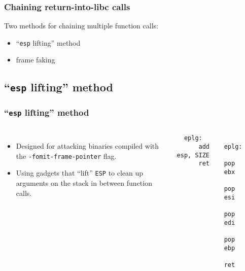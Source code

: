 \documentclass[10pt]{beamer}
\begin{document}
\begin{frame}
  \frametitle{Chaining return-into-libc calls}
  Two methods for chaining multiple function calls:
  \begin{itemize}
    \item ``\texttt{esp} lifting'' method
    \item frame faking
  \end{itemize}
\end{frame}

\subsection{``\texttt{esp} lifting'' method}

\begin{frame}
  \frametitle{``\texttt{esp} lifting'' method}

  \begin{columns}[c]

  \begin{itemize}
    \item Designed for attacking binaries compiled with the
      \texttt{-fomit-frame-pointer} flag.

    \item Using gadgets that ``lift'' \texttt{ESP} to clean up arguments on the
      stack in between function calls.
  \end{itemize}

  \begin{lstlisting}
  eplg:
      add esp, SIZE
      ret
  \end{lstlisting}

  \begin{lstlisting}
  eplg:
      pop ebx
      pop esi
      pop edi
      pop ebp
      ret
  \end{lstlisting}


  \begin{drawstack}[scale=0.50]
    \startframe
    \cell{\dots}
  \end{drawstack}


\end{columns}
\end{frame}
\end{document}
